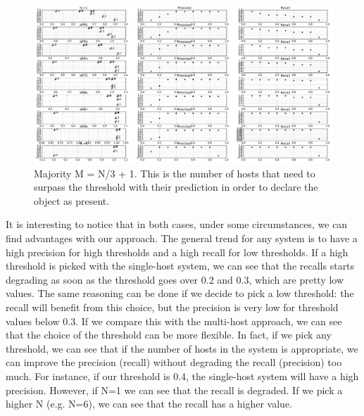 \documentclass[10pt,conference,compsocconf]{IEEEtran}
\begin{document}
\begin{figure}
	\captionsetup{type=figure}
	\includegraphics[width=\textwidth]{img/summary_majority_THIRD_BIG.png}
	\caption {Majority M = N/3 + 1. This is the number of hosts that need to surpass the threshold with their prediction in order to declare the object as present.}
	\label{fig:person_FP_FN_summary_majority3}
\end{figure}
It is interesting to notice that in both cases, under some circumstances, we can find advantages with our approach. The general trend for any system is to have a high precision for high thresholds and a high recall for low thresholds. If a high threshold is picked with the single-host system, we can see that the recalls starts degrading as soon as the threshold goes over 0.2 and 0.3, which are pretty low values. The same reasoning can be done if we decide to pick a low threshold: the recall will benefit from this choice, but the precision is very low for threshold values below 0.3.
If we compare this with the multi-host approach, we can see that the choice of the threshold can be more flexible. In fact, if we pick any threshold, we can see that if the number of hosts in the system is appropriate, we can improve the precision (recall) without degrading the recall (precision) too much.
For instance, if our threshold is 0.4, the single-host system will have a high precision. However, if N=1 we can see that the recall is degraded. If we pick a higher N (e.g. N=6), we can see that the recall has a higher value.
\end{document}
